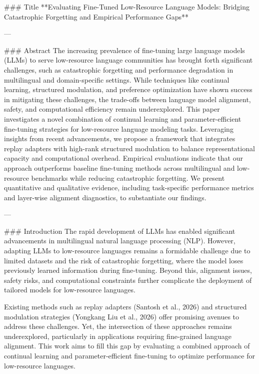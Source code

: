### Title  
**Evaluating Fine-Tuned Low-Resource Language Models: Bridging Catastrophic Forgetting and Empirical Performance Gaps**

---

### Abstract  
The increasing prevalence of fine-tuning large language models (LLMs) to serve low-resource language communities has brought forth significant challenges, such as catastrophic forgetting and performance degradation in multilingual and domain-specific settings. While techniques like continual learning, structured modulation, and preference optimization have shown success in mitigating these challenges, the trade-offs between language model alignment, safety, and computational efficiency remain underexplored. This paper investigates a novel combination of continual learning and parameter-efficient fine-tuning strategies for low-resource language modeling tasks. Leveraging insights from recent advancements, we propose a framework that integrates replay adapters with high-rank structured modulation to balance representational capacity and computational overhead. Empirical evaluations indicate that our approach outperforms baseline fine-tuning methods across multilingual and low-resource benchmarks while reducing catastrophic forgetting. We present quantitative and qualitative evidence, including task-specific performance metrics and layer-wise alignment diagnostics, to substantiate our findings.  

---

### Introduction  
The rapid development of LLMs has enabled significant advancements in multilingual natural language processing (NLP). However, adapting LLMs to low-resource languages remains a formidable challenge due to limited datasets and the risk of catastrophic forgetting, where the model loses previously learned information during fine-tuning. Beyond this, alignment issues, safety risks, and computational constraints further complicate the deployment of tailored models for low-resource languages.  

Existing methods such as replay adapters (Santosh et al., 2026) and structured modulation strategies (Yongkang Liu et al., 2026) offer promising avenues to address these challenges. Yet, the intersection of these approaches remains underexplored, particularly in applications requiring fine-grained language alignment. This work aims to fill this gap by evaluating a combined approach of continual learning and parameter-efficient fine-tuning to optimize performance for low-resource languages.  

